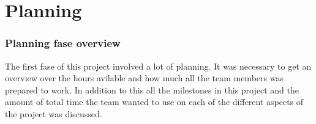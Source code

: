\chapter{Planning}

\subsection{Planning fase overview}
The first fase of this project involved a lot of planning. It was necessary to get an overview over the hours avilable and how much all the team members was prepared to work. In addition to this all the milestones in this project and the amount of total time the team wanted to use on each of the different aspects of the project was discussed.


\newpage


\newpage







%
